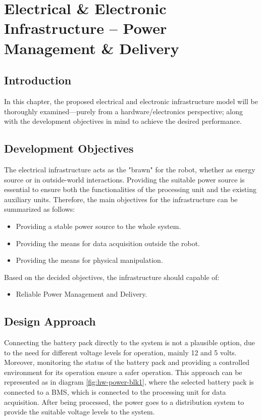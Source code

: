 \newpage
\chapter{Electrical \& Electronic Infrastructure -- Power Management \& Delivery}

\section{Introduction}
\vspace{-2mm}
In this chapter, the proposed electrical and electronic infrastructure model will be thoroughly examined---purely from a hardware/electronics perspective; along with the development objectives in mind to achieve the desired performance.

\section{Development Objectives}
The electrical infrastructure acts as the "brawn" for the robot, whether as energy source or in outside-world interactions. Providing the suitable power source is essential to ensure both the functionalities of the processing unit and the existing auxiliary units. Therefore, the main objectives for the infrastructure can be summarized as follows:
\begin{itemize}
    \item Providing a stable power source to the whole system.
    \item Providing the means for data acquisition outside the robot.
    \item Providing the means for physical manipulation.
\end{itemize}
Based on the decided objectives, the infrastructure should capable of:
\begin{itemize}
    \item Reliable Power Management and Delivery. 
\end{itemize}

\vspace{-1mm}
\section{Design Approach}\label{sect:d_approach}
Connecting the battery pack directly to the system is not a plausible option, due to the need for different voltage levels for operation, mainly 12 and 5 volts. Moreover, monitoring the status of the battery pack and providing a controlled environment for its operation ensure a safer operation.
\newline This approach can be represented as in diagram \ref{fig:hw-power-blk1}, where the selected battery pack is connected to a BMS, which is connected to the processing unit for data acquisition. After being processed, the power goes to a distribution system to provide the suitable voltage levels to the system. 

